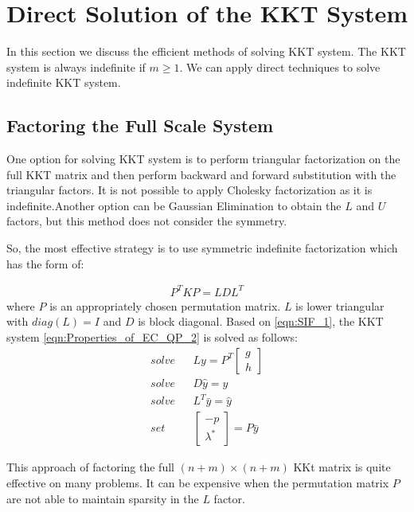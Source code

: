 \section{Direct Solution of the KKT System}

In this section we discuss the efficient methods of solving KKT system. The KKT system is always indefinite if $m\geqslant1$. We can apply direct techniques to solve indefinite KKT system.

\subsection*{Factoring the Full Scale System}
One option for solving KKT system is to perform triangular factorization on the full KKT matrix and then perform backward and forward substitution with the triangular factors. It is not possible to apply Cholesky factorization as it is indefinite.Another option can be Gaussian Elimination to obtain the $L$ and $U$ factors, but this method does not consider the symmetry.

So, the most effective strategy is to use symmetric indefinite factorization which has the form of:

\begin{equation}
	\begin{aligned}
		P^TKP = LDL^T
	\end{aligned}
	\label{eqn:SIF_1}
\end{equation}
where $P$ is an appropriately chosen permutation matrix. $L$ is lower triangular with $diag(L) = I$ and $D$ is block diagonal.
Based on \ref{eqn:SIF_1}, the KKT system \ref{eqn:Properties_of_EC_QP_2} is solved as follows:
\begin{equation}
	\begin{aligned}
		solve & & Ly = P^T
		\begin{bmatrix}
  		g \\
    	h
    \end{bmatrix}\\
    solve & & D\hat{y} = y\\
    solve & & L^T\bar{y} = \hat{y}\\
    set & & \begin{bmatrix}
  		-p \\
    	\lambda^*
    \end{bmatrix} = P\bar{y}
	\end{aligned}
	\label{eqn:SIF_2}
\end{equation}

This approach of factoring  the full $(n+m)\times (n+m)$ KKt matrix is quite effective  on many problems. It can be expensive when the permutation matrix $P$ are not able to maintain sparsity in the $L$ factor.
